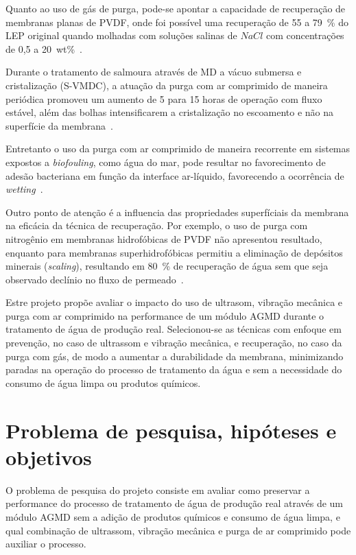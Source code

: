 \documentclass[a4paper,12pt]{article}
\begin{document}
Quanto ao uso de gás de purga, pode-se apontar a capacidade de recuperação de membranas planas de PVDF, onde foi possível uma recuperação de 55 a 79~\% do LEP original quando molhadas com soluções salinas de $NaCl$ com concentrações de 0,5 a 20~wt\%~\cite{Warsinger2017ReversingWetting}.

Durante o tratamento de salmoura através de MD a vácuo submersa e cristalização (S-VMDC), a atuação da purga com ar comprimido de maneira periódica promoveu um aumento de 5 para 15 horas de operação com fluxo estável, além das bolhas intensificarem a cristalização no escoamento e não na superfície da membrana~\cite{Julian2018AirBackwash}.

Entretanto o uso da purga com ar comprimido de maneira recorrente em sistemas expostos a \textit{biofouling}, como água do mar, pode resultar no favorecimento de adesão bacteriana em função da interface ar-líquido, favorecendo a ocorrência de \textit{wetting}~\cite{Harimawan2022Biofouling}.

Outro ponto de atenção é a influencia das propriedades superfíciais da membrana na eficácia da técnica de recuperação. Por exemplo, o uso de purga com nitrogênio em membranas hidrofóbicas de PVDF não apresentou resultado, enquanto para membranas superhidrofóbicas permitiu a eliminação de depósitos minerais (\textit{scaling}), resultando em 80~\% de recuperação de água sem que seja observado declínio no fluxo de permeado~\cite{Horseman2019GasPurging}.

Estre projeto propõe avaliar o impacto do uso de ultrasom, vibração mecânica e purga com ar comprimido na performance de um módulo AGMD durante o tratamento de água de produção real. Selecionou-se as técnicas com enfoque em prevenção, no caso de ultrassom e vibração mecânica, e recuperação, no caso da purga com gás, de modo a aumentar a durabilidade da membrana, minimizando paradas na operação do processo de tratamento da água e sem a necessidade do consumo de água limpa ou produtos químicos.  

\section{Problema de pesquisa, hipóteses e objetivos}

O problema de pesquisa do projeto consiste em avaliar como preservar a performance do processo de tratamento de água de produção real através de um módulo AGMD sem a adição de produtos químicos e consumo de água limpa, e qual combinação de ultrassom, vibração mecânica e purga de ar comprimido pode auxiliar o processo.  
\end{document}
